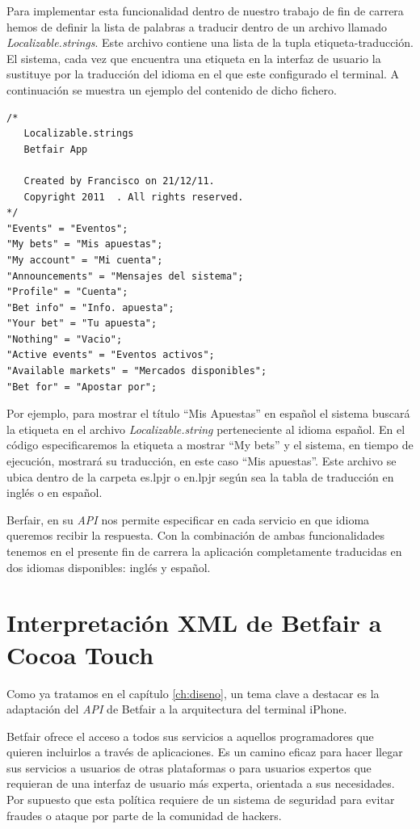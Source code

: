   
  
  Para implementar esta funcionalidad dentro de nuestro trabajo de fin de carrera hemos de definir la lista de palabras a traducir dentro de un archivo llamado \emph{Localizable.strings}.  Este archivo contiene una lista de la tupla etiqueta-traducción. El sistema, cada vez que encuentra una etiqueta en la interfaz de usuario la sustituye por la traducción del idioma en el que este configurado el terminal. A continuación se muestra un ejemplo del contenido de dicho fichero.
  
\begin{lstlisting}
/* 
   Localizable.strings
   Betfair App

   Created by Francisco on 21/12/11.
   Copyright 2011  . All rights reserved.
*/
"Events" = "Eventos";
"My bets" = "Mis apuestas";
"My account" = "Mi cuenta";
"Announcements" = "Mensajes del sistema";
"Profile" = "Cuenta";
"Bet info" = "Info. apuesta";
"Your bet" = "Tu apuesta";
"Nothing" = "Vacio";
"Active events" = "Eventos activos";
"Available markets" = "Mercados disponibles";
"Bet for" = "Apostar por";  
\end{lstlisting}

  
   Por ejemplo, para mostrar el título ``Mis Apuestas'' en español el sistema buscará la etiqueta en el archivo \emph{Localizable.string} perteneciente al idioma español. En el código especificaremos la etiqueta a mostrar ``My bets'' y el sistema, en tiempo de ejecución, mostrará su traducción, en este caso ``Mis apuestas''.  Este archivo se ubica dentro de la carpeta es.lpjr o en.lpjr según sea la tabla de traducción en inglés o en español. 
   
   Berfair, en su \emph{API} nos permite especificar en cada servicio en que idioma queremos recibir la respuesta. Con la combinación de ambas funcionalidades tenemos en el presente fin de carrera la aplicación completamente traducidas en dos idiomas disponibles: inglés y español. 
   
\section{Interpretación XML de Betfair a Cocoa Touch}
 Como ya tratamos en el capítulo \ref{ch:diseno}, un tema clave a destacar es la adaptación del \emph{API} de Betfair a la arquitectura del terminal iPhone. 
 
  Betfair ofrece el acceso a todos sus servicios a aquellos programadores que quieren incluirlos a través de aplicaciones. Es un camino eficaz para hacer llegar sus servicios a usuarios de otras plataformas o para usuarios expertos que requieran de una interfaz de usuario más experta, orientada a sus necesidades. Por supuesto que esta política requiere de un sistema de seguridad para evitar fraudes o ataque por parte de la comunidad de hackers.
   
